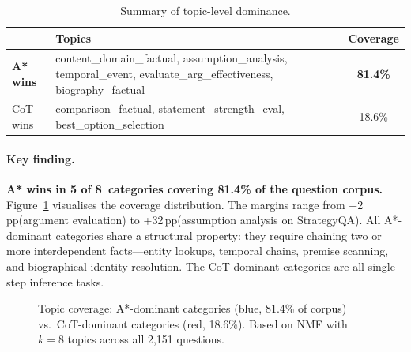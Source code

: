 \documentclass[11pt]{article}
\newcommand{\pp}{\,pp}
\begin{document}
\begin{table}[t]
\centering
\caption{Summary of topic-level dominance.}
\label{tab:dominance}
\small
\begin{tabular}{@{}p{1.2cm}p{8cm}c@{}}
\toprule
& \textbf{Topics} & \textbf{Coverage} \\
\midrule
\textbf{A* wins} & content\_domain\_factual, assumption\_analysis, temporal\_event, evaluate\_arg\_effectiveness, biography\_factual & \textbf{81.4\%} \\[4pt]
CoT wins & comparison\_factual, statement\_strength\_eval, best\_option\_selection & 18.6\% \\
\bottomrule
\end{tabular}
\end{table}

\paragraph{Key finding.}
\textbf{A* wins in 5 of 8~categories covering 81.4\% of the question corpus.} Figure~\ref{fig:topic_dominance} visualises the coverage distribution. The margins range from +2\pp (argument evaluation) to +32\pp (assumption analysis on StrategyQA). All A*-dominant categories share a structural property: they require chaining two or more interdependent facts---entity lookups, temporal chains, premise scanning, and biographical identity resolution. The CoT-dominant categories are all single-step inference tasks.

\begin{figure}[t]
\centering
{}
\caption{Topic coverage: A*-dominant categories (blue, 81.4\% of corpus) vs.\ CoT-dominant categories (red, 18.6\%). Based on NMF with $k{=}8$ topics across all 2,151 questions.}
\label{fig:topic_dominance}
\end{figure}
\end{document}
